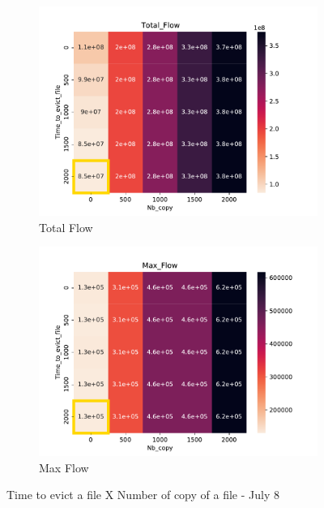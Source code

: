 \documentclass[a4paper]{article}
\begin{document}
\begin{figure}[H]
\begin{subfigure}[b]{0.4\linewidth}\centering\includegraphics[width=1\linewidth]{MBSS/plot/Heatmap_Total_Flow_FCFS_Score_Time_to_evict_file_Nb_copy_2022-01-24->2022-01-24_450_128_32_256_4_1024.pdf}\caption{Total Flow}\end{subfigure}
\begin{subfigure}[b]{0.4\linewidth}\centering\includegraphics[width=1\linewidth]{MBSS/plot/Heatmap_Max_Flow_FCFS_Score_Time_to_evict_file_Nb_copy_2022-01-24->2022-01-24_450_128_32_256_4_1024.pdf}\caption{Max Flow}\end{subfigure}
\caption{Time to evict a file X Number of copy of a file - July 8}\end{figure}
\end{document}
